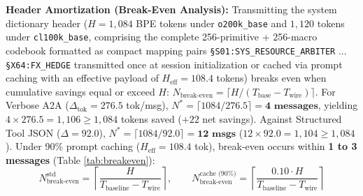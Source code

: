 \documentclass[9pt,a4paper]{extarticle}
\begin{document}
\textbf{Header Amortization (Break-Even Analysis):} Transmitting the system dictionary header ($H = 1{,}084$ BPE tokens under \texttt{o200k\_base} and $1{,}120$ tokens under \texttt{cl100k\_base}, comprising the complete 256-primitive + 256-macro codebook formatted as compact mapping pairs \texttt{\S S01:SYS\_RESOURCE\_ARBITER} ... \texttt{\S X64:FX\_HEDGE} transmitted once at session initialization or cached via prompt caching with an effective payload of $H_{\text{eff}} = 108.4$ tokens) breaks even when cumulative savings equal or exceed $H$: $N_{\text{break-even}} = \lceil H / (T_{\text{base}} - T_{\text{wire}}) \rceil$. For Verbose A2A ($\Delta_{\text{tok}} = 276.5$ tok/msg), $N^* = \lceil 1084/276.5 \rceil = \mathbf{4\text{ messages}}$, yielding $4 \times 276.5 = 1{,}106 \ge 1{,}084$ tokens saved ($+22$ net savings). Against Structured Tool JSON ($\Delta = 92.0$), $N^* = \lceil 1084/92.0 \rceil = \mathbf{12\text{ msgs}}$ ($12 \times 92.0 = 1{,}104 \ge 1{,}084$). Under 90\% prompt caching ($H_{\text{eff}} = 108.4$ tok), break-even occurs within \textbf{1 to 3 messages} (Table \ref{tab:breakeven}):
\begin{equation}
  N_{\text{break-even}}^{\text{std}} = \left\lceil \frac{H}{T_{\text{baseline}} - T_{\text{wire}}} \right\rceil, \qquad
  N_{\text{break-even}}^{\text{cache (90\%)}} = \left\lceil \frac{0.10 \cdot H}{T_{\text{baseline}} - T_{\text{wire}}} \right\rceil
  \label{eq:breakeven}
\end{equation}
\end{document}
